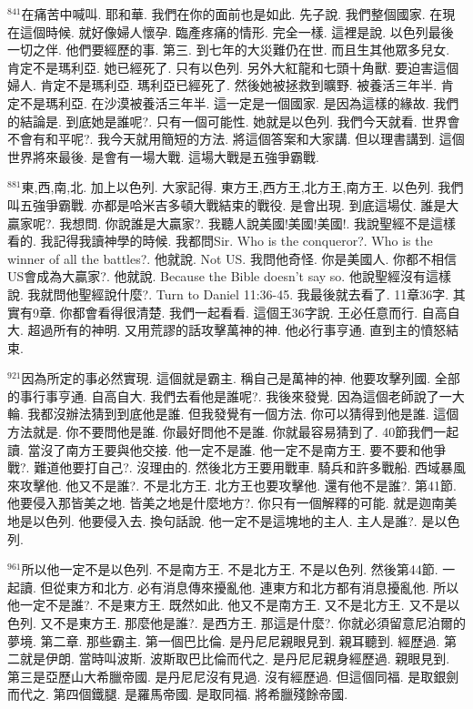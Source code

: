 \documentclass{book}
\begin{document}
$^{841}$在痛苦中喊叫.
耶和華.
我們在你的面前也是如此.
先子說.
我們整個國家.
在現在這個時候.
就好像婦人懷孕.
臨產疼痛的情形.
完全一樣.
這裡是說.
以色列最後一切之伴.
他們要經歷的事.
第三.
到七年的大災難仍在世.
而且生其他眾多兒女.
肯定不是瑪利亞.
她已經死了.
只有以色列.
另外大紅龍和七頭十角獸.
要迫害這個婦人.
肯定不是瑪利亞.
瑪利亞已經死了.
然後她被拯救到曠野.
被養活三年半.
肯定不是瑪利亞.
在沙漠被養活三年半.
這一定是一個國家.
是因為這樣的緣故.
我們的結論是.
到底她是誰呢?.
只有一個可能性.
她就是以色列.
我們今天就看.
世界會不會有和平呢?.
我今天就用簡短的方法.
將這個答案和大家講.
但以理書講到.
這個世界將來最後.
是會有一場大戰.
這場大戰是五強爭霸戰.

$^{881}$東,西,南,北.
加上以色列.
大家記得.
東方王,西方王,北方王,南方王.
以色列.
我們叫五強爭霸戰.
亦都是哈米吉多頓大戰結束的戰役.
是會出現.
到底這場仗.
誰是大贏家呢?.
我想問.
你說誰是大贏家?.
我聽人說美國!美國!美國!.
我說聖經不是這樣看的.
我記得我讀神學的時候.
我都問Sir.
Who is the conqueror?.
Who is the winner of all the battles?.
他就說.
Not US.
我問他奇怪.
你是美國人.
你都不相信US會成為大贏家?.
他就說.
Because the Bible doesn't say so.
他說聖經沒有這樣說.
我就問他聖經說什麼?.
Turn to Daniel 11:36-45.
我最後就去看了.
11章36字.
其實有9章.
你都會看得很清楚.
我們一起看看.
這個王36字說.
王必任意而行.
自高自大.
超過所有的神明.
又用荒謬的話攻擊萬神的神.
他必行事亨通.
直到主的憤怒結束.

$^{921}$因為所定的事必然實現.
這個就是霸主.
稱自己是萬神的神.
他要攻擊列國.
全部的事行事亨通.
自高自大.
我們去看他是誰呢?.
我後來發覺.
因為這個老師說了一大輪.
我都沒辦法猜到到底他是誰.
但我發覺有一個方法.
你可以猜得到他是誰.
這個方法就是.
你不要問他是誰.
你最好問他不是誰.
你就最容易猜到了.
40節我們一起讀.
當沒了南方王要與他交接.
他一定不是誰.
他一定不是南方王.
要不要和他爭戰?.
難道他要打自己?.
沒理由的.
然後北方王要用戰車.
騎兵和許多戰船.
西域暴風來攻擊他.
他又不是誰?.
不是北方王.
北方王也要攻擊他.
還有他不是誰?.
第41節.
他要侵入那皆美之地.
皆美之地是什麼地方?.
你只有一個解釋的可能.
就是迦南美地是以色列.
他要侵入去.
換句話說.
他一定不是這塊地的主人.
主人是誰?.
是以色列.

$^{961}$所以他一定不是以色列.
不是南方王.
不是北方王.
不是以色列.
然後第44節.
一起讀.
但從東方和北方.
必有消息傳來擾亂他.
連東方和北方都有消息擾亂他.
所以他一定不是誰?.
不是東方王.
既然如此.
他又不是南方王.
又不是北方王.
又不是以色列.
又不是東方王.
那麼他是誰?.
是西方王.
那這是什麼?.
你就必須留意尼泊爾的夢境.
第二章.
那些霸主.
第一個巴比倫.
是丹尼尼親眼見到.
親耳聽到.
經歷過.
第二就是伊朗.
當時叫波斯.
波斯取巴比倫而代之.
是丹尼尼親身經歷過.
親眼見到.
第三是亞歷山大希臘帝國.
是丹尼尼沒有見過.
沒有經歷過.
但這個同福.
是取銀劍而代之.
第四個鐵腿.
是羅馬帝國.
是取同福.
將希臘殘餘帝國.
\end{document}
